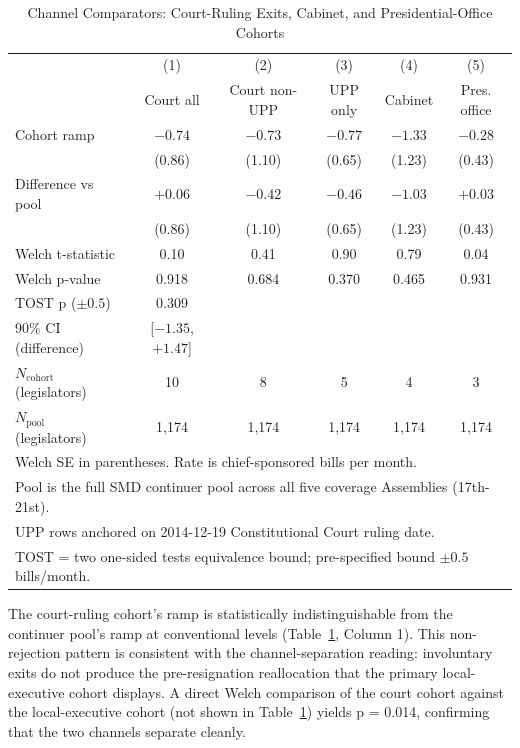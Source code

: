 \documentclass[11pt]{article}
\begin{document}
\begin{table}[H]
\centering
\caption{Channel Comparators: Court-Ruling Exits, Cabinet, and Presidential-Office Cohorts}
\label{tab:placebo}
\begin{tabular}{lccccc}
\toprule
 & (1) & (2) & (3) & (4) & (5) \\
 & Court all & Court non-UPP & UPP only & Cabinet & Pres. office \\
\midrule
Cohort ramp & $-0.74$ & $-0.73$ & $-0.77$ & $-1.33$ & $-0.28$ \\
 & (0.86) & (1.10) & (0.65) & (1.23) & (0.43) \\
Difference vs pool & $+0.06$ & $-0.42$ & $-0.46$ & $-1.03$ & $+0.03$ \\
 & (0.86) & (1.10) & (0.65) & (1.23) & (0.43) \\
Welch t-statistic & 0.10 & 0.41 & 0.90 & 0.79 & 0.04 \\
Welch p-value & 0.918 & 0.684 & 0.370 & 0.465 & 0.931 \\
TOST p ($\pm 0.5$) & 0.309 & & & & \\
90\% CI (difference) & [$-1.35$, $+1.47$] & & & & \\
\midrule
$N_{\text{cohort}}$ (legislators) & 10 & 8 & 5 & 4 & 3 \\
$N_{\text{pool}}$ (legislators) & 1{,}174 & 1{,}174 & 1{,}174 & 1{,}174 & 1{,}174 \\
\bottomrule
\multicolumn{6}{l}{\footnotesize Welch SE in parentheses. Rate is chief-sponsored bills per month.} \\
\multicolumn{6}{l}{\footnotesize Pool is the full SMD continuer pool across all five coverage Assemblies (17th-21st).} \\
\multicolumn{6}{l}{\footnotesize UPP rows anchored on 2014-12-19 Constitutional Court ruling date.} \\
\multicolumn{6}{l}{\footnotesize TOST = two one-sided tests equivalence bound; pre-specified bound $\pm 0.5$ bills/month.} \\
\end{tabular}
\end{table}

The court-ruling cohort's ramp is statistically indistinguishable from the continuer pool's ramp at conventional levels (Table~\ref{tab:placebo}, Column 1). This non-rejection pattern is consistent with the channel-separation reading: involuntary exits do not produce the pre-resignation reallocation that the primary local-executive cohort displays. A direct Welch comparison of the court cohort against the local-executive cohort (not shown in Table~\ref{tab:placebo}) yields p = 0.014, confirming that the two channels separate cleanly.
\end{document}
